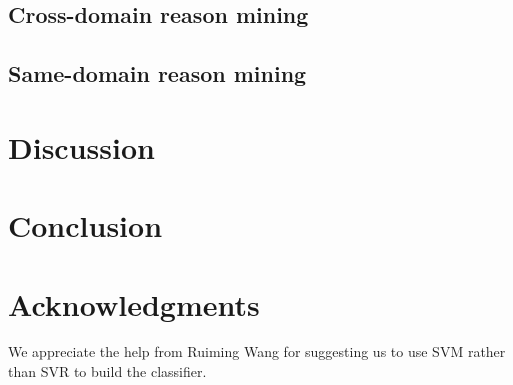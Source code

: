 \documentclass[11pt,a4paper]{article}
\begin{document}
\subsection{Cross-domain reason mining}

\subsection{Same-domain reason mining}


\section{Discussion}
\label{sec:discussion}

\section{Conclusion}
\label{sec:conclusion}


\section*{Acknowledgments}

We appreciate the help from Ruiming Wang for suggesting us to use SVM rather than SVR to build the classifier. 

% 
%


\end{document}
